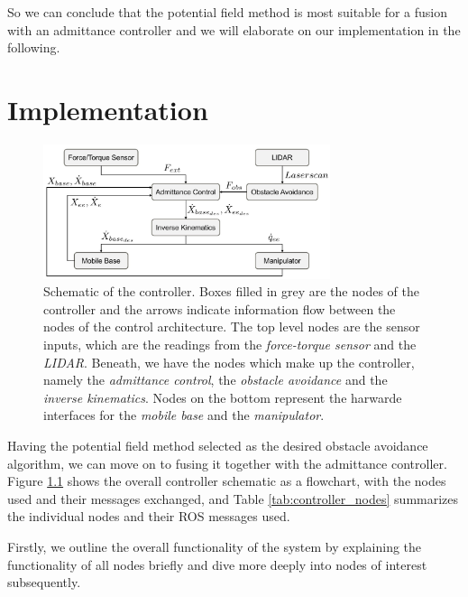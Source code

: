 So we can conclude that the potential field method is most suitable for a fusion with an admittance controller and we will elaborate on our implementation in the following.

\chapter{Implementation}
\begin{figure}
   \centering
   \includegraphics[width=0.75\textwidth]{images/controller_overview.jpg}
   \caption{Schematic of the controller. Boxes filled in grey are the nodes of the controller and the arrows indicate information flow between the nodes of the control architecture. The top level nodes are the sensor inputs, which are the readings from the \emph{force-torque sensor} and the \emph{LIDAR}. Beneath, we have the nodes which make up the controller, namely the \emph{admittance control}, the \emph{obstacle avoidance} and the \emph{inverse kinematics}. Nodes on the bottom represent the harwarde interfaces for the \emph{mobile base} and the \emph{manipulator}.}
   \label{pics:controller_overview}
\end{figure}

Having the potential field method selected as the desired obstacle avoidance algorithm, we can move on to fusing it together with the admittance controller. Figure \ref{pics:controller_overview} shows the overall controller schematic as a flowchart, with the nodes used and their messages exchanged, and Table \ref{tab:controller_nodes} summarizes the individual nodes and their ROS messages used.

Firstly, we outline the overall functionality of the system by explaining the functionality of all nodes briefly and dive more deeply into nodes of interest subsequently.

